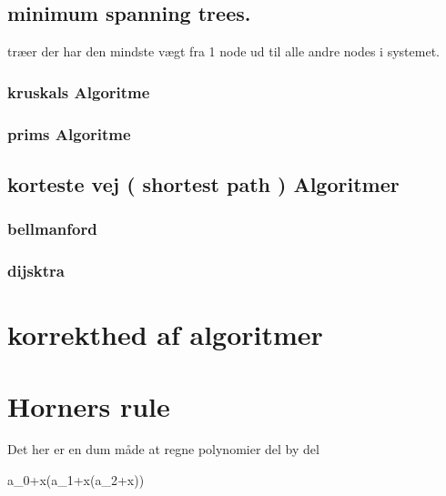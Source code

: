 \documentclass[letterpaper,10pt,danish]{sphinxmanual}
\begin{document}
\sphinxAtStartPar
{}


\subsection{minimum spanning trees.}
\label{\detokenize{Algorithmer/Graphs:minimum-spanning-trees}}
\sphinxAtStartPar
træer der har den mindste vægt fra 1 node ud til alle andre nodes i systemet.


\subsubsection{kruskals Algoritme}
\label{\detokenize{Algorithmer/Graphs:kruskals-algoritme}}
\sphinxAtStartPar
{}


\subsubsection{prims Algoritme}
\label{\detokenize{Algorithmer/Graphs:prims-algoritme}}
\sphinxAtStartPar
{}


\subsection{korteste vej ( shortest path ) Algoritmer}
\label{\detokenize{Algorithmer/Graphs:korteste-vej-shortest-path-algoritmer}}

\subsubsection{bellman\sphinxhyphen{}ford}
\label{\detokenize{Algorithmer/Graphs:bellman-ford}}
\sphinxAtStartPar
{}


\subsubsection{dijsktra}
\label{\detokenize{Algorithmer/Graphs:dijsktra}}
\sphinxAtStartPar
{}

\sphinxstepscope


\section{korrekthed af algoritmer}
\label{\detokenize{Algorithmer/Korrekthed:korrekthed-af-algoritmer}}\label{\detokenize{Algorithmer/Korrekthed::doc}}

\section{Horners rule}
\label{\detokenize{Algorithmer/Korrekthed:horners-rule}}
\sphinxAtStartPar
Det her er en dum måde at regne polynomier del by del

\sphinxAtStartPar
a\_0+x(a\_1+x(a\_2+x))


\section{}
\label{\detokenize{Algorithmer/Korrekthed:id1}}


\renewcommand{\indexname}{Indeks}
\printindex
\end{document}
